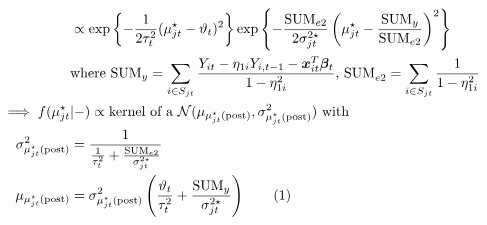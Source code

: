 \documentclass[12pt,	%
	a4paper,		%
	twoside,		%
	openright,		%
	titlepage,%
	]{book}
\theoremstyle{definition}
\begin{document}
\begin{itemize}
\begin{align*}
    &\propto \expp{-\frac{1}{2\tau_t^2}(\mu^\star_{jt}-\theta_t)^2} \expp{-\frac{\text{SUM}_{e2}}{2\sigma^{2\star}_{jt}}\left( \mu^\star_{jt}-\frac{\text{SUM}_y}{\text{SUM}_{e2}}\right)^2}\\
    &\text{where SUM}_y = \sum_{i \in S_{jt}} \frac{Y_{it}-\eta_{1i}Y_{i,t-1}-\vec{x}_{it}^T\vec{\beta}_t}{1-\eta_{1i}^2} \text{, SUM}_{e2} = \sum_{i \in S_{jt}} \frac{1}{1-\eta_{1i}^2}\\
\implies f(\mu^\star_{jt}&|-) \propto \text{kernel of a $\N(\mu_{\postp{\mu^\star_{jt}}},\sigma^2_{\postp{\mu^\star_{jt}}})$ with}\\
\sigma^2_{\postp{\mu^\star_{jt}}}&=\frac{1}{\frac{1}{\tau_t^2}+\frac{\text{SUM}_{e2}}{\sigma^{2\star}_{jt}}}\\
%
\mu_{\postp{\mu^\star_{jt}}}&=\sigma^2_{\postp{\mu^\star_{jt}}}\left( \frac{\theta_t}{\tau_t^2} + \frac{\text{SUM}_y}{\sigma_{jt}^{2\star}} \right)
\tag{\stepcounter{equation}\theequation}
\end{align*}



\end{itemize}
\end{document}
